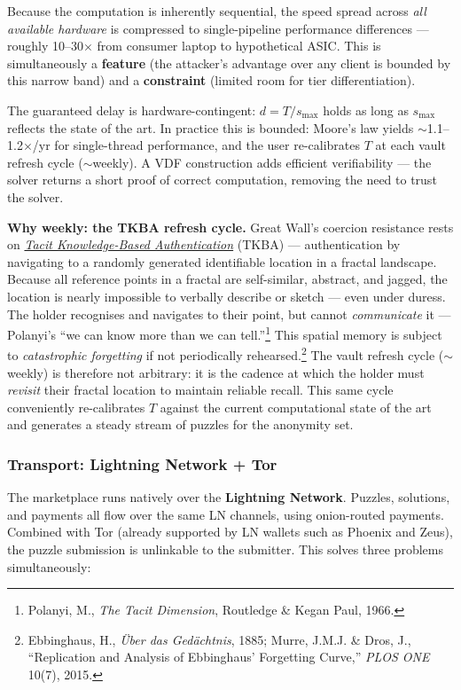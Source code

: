 \documentclass[a4paper,11pt]{article}
\begin{document}
Because the computation is inherently sequential, the speed spread across \textit{all available hardware} is compressed to single-pipeline performance differences --- roughly 10--30$\times$ from consumer laptop to hypothetical ASIC. This is simultaneously a \textbf{feature} (the attacker's advantage over any client is bounded by this narrow band) and a \textbf{constraint} (limited room for tier differentiation).

The guaranteed delay is hardware-contingent: $d = T / s_{\max}$ holds as long as $s_{\max}$ reflects the state of the art. In practice this is bounded: Moore's law yields $\sim$1.1--1.2$\times$/yr for single-thread performance, and the user re-calibrates $T$ at each vault refresh cycle ($\sim$weekly). A VDF construction adds efficient verifiability --- the solver returns a short proof of correct computation, removing the need to trust the solver.

\medskip
\noindent\textbf{Why weekly: the TKBA refresh cycle.} Great Wall's coercion resistance rests on \href{https://en.wikipedia.org/wiki/Tacit_knowledge}{\textit{Tacit Knowledge-Based Authentication}} (TKBA) --- authentication by navigating to a randomly generated identifiable location in a fractal landscape. Because all reference points in a fractal are self-similar, abstract, and jagged, the location is nearly impossible to verbally describe or sketch --- even under duress. The holder recognises and navigates to their point, but cannot \textit{communicate} it --- Polanyi's ``we can know more than we can tell.''\footnote{Polanyi, M., \textit{The Tacit Dimension}, Routledge \& Kegan Paul, 1966.} This spatial memory is subject to \textit{catastrophic forgetting} if not periodically rehearsed.\footnote{Ebbinghaus, H., \textit{{\"U}ber das Ged{\"a}chtnis}, 1885; Murre, J.M.J. \& Dros, J., ``Replication and Analysis of Ebbinghaus' Forgetting Curve,'' \textit{PLOS ONE} 10(7), 2015.} The vault refresh cycle ($\sim$weekly) is therefore not arbitrary: it is the cadence at which the holder must \textit{revisit} their fractal location to maintain reliable recall. This same cycle conveniently re-calibrates $T$ against the current computational state of the art and generates a steady stream of puzzles for the anonymity set.

\subsubsection{Transport: Lightning Network + Tor}

The marketplace runs natively over the \textbf{Lightning Network}. Puzzles, solutions, and payments all flow over the same LN channels, using onion-routed payments. Combined with Tor (already supported by LN wallets such as Phoenix and Zeus), the puzzle submission is unlinkable to the submitter. This solves three problems simultaneously:
\end{document}
